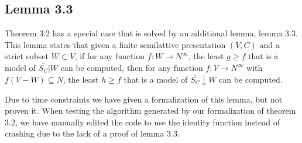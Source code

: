 \subsection{Lemma 3.3}

Theorem 3.2 has a special case that is solved by an additional lemma,
lemma 3.3. This lemma states that given a finite semilattive presentation
$(V, C)$ and a strict subset $W \subset V$, if for any function
$f : W \rightarrow N^{\infty}$, the least $g \ge f$ that is a model of
$\overline{S_C}|W$ can be computed, then for any function
$f : V \rightarrow N^{\infty}$ with $f(V - W) \subseteq N$,
the least $h \ge f$ that is a model of $\overline{S_C}\downarrow W$ can be computed.

Due to time constraints we have given a formalization of this lemma,
but not proven it.
When testing the algorithm generated by our formalization of theorem 3.2,
we have manually edited the code to use the identity function instead of crashing due to
the lack of a proof of lemma 3.3.
